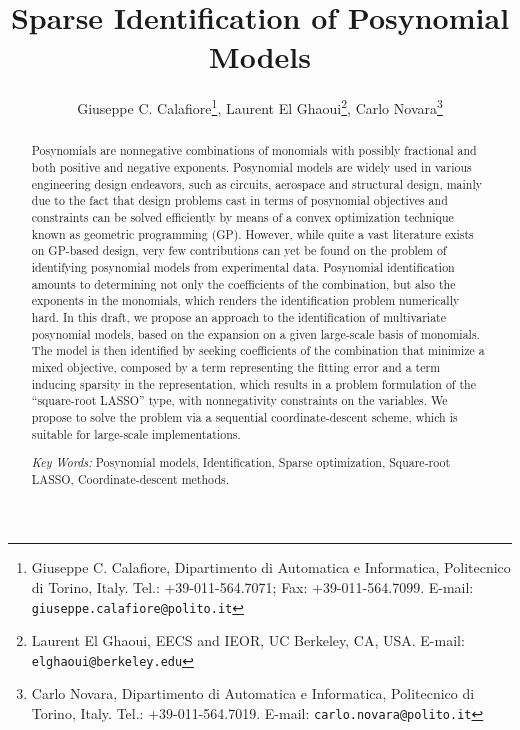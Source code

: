 \documentclass[11pt]{article}
\begin{document}
\author{Giuseppe C. Calafiore\thanks{Giuseppe C. Calafiore, Dipartimento di Automatica e Informatica,
Politecnico di Torino, Italy.
Tel.: +39-011-564.7071; Fax:
+39-011-564.7099. E-mail: {\tt giuseppe.calafiore@polito.it}
},
Laurent El Ghaoui\thanks{Laurent El Ghaoui, EECS and IEOR, UC Berkeley, CA, USA. E-mail: {\tt  elghaoui@berkeley.edu}},
Carlo Novara\thanks{Carlo Novara, Dipartimento di Automatica e Informatica,
Politecnico di Torino, Italy.
Tel.: +39-011-564.7019. E-mail: {\tt carlo.novara@polito.it}}
}

\title{Sparse Identification of Posynomial Models}

\date{}
\maketitle


\begin{abstract}

Posynomials are nonnegative combinations of monomials with possibly fractional and both positive and negative exponents. 
Posynomial models are widely used in various engineering design endeavors,  such as circuits, aerospace and structural design, mainly due to the fact that design problems cast in terms of posynomial objectives and constraints can be solved efficiently by means of a convex optimization technique known as geometric programming (GP). However, while quite a vast literature exists on GP-based design, very few contributions can yet be found on the problem of identifying posynomial models from experimental data.  Posynomial identification amounts to determining not only the coefficients of the combination, but also the exponents in the monomials, which renders the identification problem numerically hard.  In this draft, we propose an approach to the identification of multivariate posynomial models, based on the expansion on a given large-scale basis of monomials. The  model is then identified  by seeking coefficients of the combination that minimize a mixed objective, composed by a term representing the fitting error and a term inducing sparsity in the representation, which results in a problem formulation of the ``square-root LASSO'' type, with nonnegativity constraints on the variables. We propose to solve the problem via a sequential coordinate-descent scheme, which is suitable for large-scale implementations.

\vspace{.1cm}

\noindent
{\em Key Words: } Posynomial models, Identification, Sparse optimization, Square-root LASSO, Coordinate-descent methods.
\end{abstract}
\end{document}
